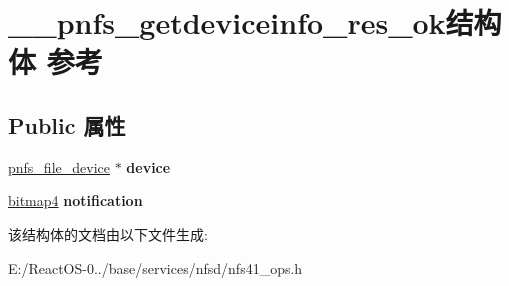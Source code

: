 \hypertarget{struct____pnfs__getdeviceinfo__res__ok}{}\section{\+\_\+\+\_\+pnfs\+\_\+getdeviceinfo\+\_\+res\+\_\+ok结构体 参考}
\label{struct____pnfs__getdeviceinfo__res__ok}
\subsection*{Public 属性}
\begin{DoxyCompactItemize}
\item 
\mbox{\label{struct____pnfs__getdeviceinfo__res__ok_a819d3b978d821829f8c3f34249d4f450}} 
\hyperlink{struct____pnfs__file__device}{pnfs\+\_\+file\+\_\+device} $\ast$ {\bfseries device}
\item 
\mbox{\label{struct____pnfs__getdeviceinfo__res__ok_a86e520d416992542db439b05e736d306}} 
\hyperlink{struct____bitmap4}{bitmap4} {\bfseries notification}
\end{DoxyCompactItemize}


该结构体的文档由以下文件生成\+:\begin{DoxyCompactItemize}
\item 
E\+:/\+React\+O\+S-\/0../base/services/nfsd/nfs41\+\_\+ops.\+h\end{DoxyCompactItemize}
